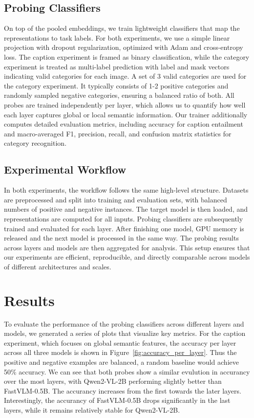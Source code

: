 \documentclass[11pt]{article}
\begin{document}
\subsection{Probing Classifiers}
On top of the pooled embeddings, we train lightweight classifiers that map the
representations to task labels. For both experiments, we use a simple linear
projection with dropout regularization, optimized with Adam and cross-entropy loss.
The caption experiment is framed as binary classification, while the category experiment
is treated as multi-label prediction with label and mask vectors indicating valid
categories for each image. A set of 3 valid categories are used for the category experiment.
It typically consists of 1-2 positive categories and randomly sampled negative categories,
ensuring a balanced ratio of both. All probes are trained independently per layer, which allows
us to quantify how well each layer captures global or local semantic information.
Our trainer additionally computes detailed evaluation metrics, including accuracy for
caption entailment and macro-averaged F1, precision, recall, and confusion matrix
statistics for category recognition.

\subsection{Experimental Workflow}
In both experiments, the workflow follows the same high-level structure.
Datasets are preprocessed and split into training and evaluation sets, with
balanced numbers of positive and negative instances. The target model is then
loaded, and representations are computed for all inputs. Probing classifiers are subsequently trained
and evaluated for each layer. After finishing one model, GPU memory is released
and the next model is processed in the same way. The probing results across
layers and models are then aggregated for analysis. This setup ensures that
our experiments are efficient, reproducible, and directly comparable across
models of different architectures and scales.


\section{Results}
To evaluate the performance of the probing classifiers across different layers
and models, we generated a series of plots that visualize key metrics.
For the caption experiment, which focuses on global semantic features, the accuracy per layer
across all three models is shown in Figure~\ref{fig:accuracy_per_layer}.
Thus the positive and negative examples are balanced, a random baseline would achieve 50\% accuracy.
We can see that both probes show a similar evulution in accurancy over the most layers, with Qwen2-VL-2B performing slightly better than FastVLM-0.5B.
The accurancy increases from the first towards the later layers.
Interestingly, the accurancy of FastVLM-0.5B drops significantly in the last layers, while it remains relatively stable for Qwen2-VL-2B.
\end{document}
